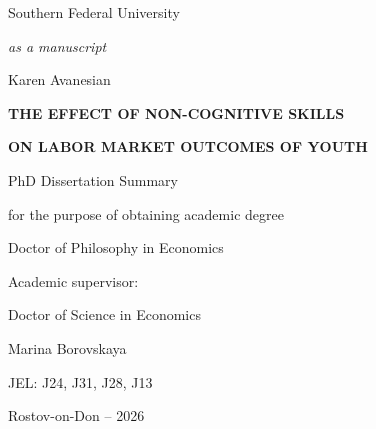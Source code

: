 
\begin{titlepage}
\thispagestyle{empty}
\begin{center}
{\fontsize{16pt}{18.4pt}\selectfont Southern Federal University\par}
\end{center}

\vspace{1.5cm}

\begin{flushright}
{\fontsize{14pt}{16.1pt}\selectfont\itshape as a manuscript\par}
\end{flushright}

\vspace{2.0cm}

\begin{center}
{\fontsize{16pt}{18.4pt}\selectfont Karen Avanesian\par}

\vspace{1.2cm}

{\fontsize{16pt}{18.4pt}\selectfont\bfseries THE EFFECT OF NON-COGNITIVE SKILLS\par}
{\fontsize{16pt}{18.4pt}\selectfont\bfseries ON LABOR MARKET OUTCOMES OF YOUTH\par}

\vspace{1.0cm}

{\fontsize{16pt}{18.4pt}\selectfont PhD Dissertation Summary\par}
{\fontsize{16pt}{18.4pt}\selectfont for the purpose of obtaining academic degree\par}
{\fontsize{16pt}{18.4pt}\selectfont Doctor of Philosophy in Economics\par}
\end{center}

\vspace{2.0cm}

\begin{flushright}
{\fontsize{16pt}{18.4pt}\selectfont Academic supervisor:\par}
{\fontsize{16pt}{18.4pt}\selectfont Doctor of Science in Economics\par}
{\fontsize{16pt}{18.4pt}\selectfont Marina Borovskaya\par}

\vspace{1.0cm}

{\fontsize{16pt}{18.4pt}\selectfont JEL: J24, J31, J28, J13\par}
\end{flushright}

\vfill

\begin{center}
{\fontsize{16pt}{18.4pt}\selectfont Rostov-on-Don -- 2026\par}
\end{center}
\end{titlepage}

\clearpage
{}
\setcounter{page}{2}
